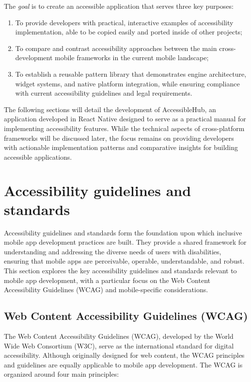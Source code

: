 The \textit{goal} is to create an accessible application that serves three key purposes:
\begin{enumerate}
    \item To provide developers with practical, interactive examples of accessibility implementation, able to be copied easily and ported inside of other projects;
    \item To compare and contrast accessibility approaches between the main cross-development mobile frameworks in the current mobile landscape;
    \item To establish a reusable pattern library that demonstrates engine architecture, widget systems, and native platform integration, while ensuring compliance with current accessibility guidelines and legal requirements.
\end{enumerate}

The following sections will detail the development of AccessibleHub, an application developed in React Native designed to serve as a practical manual for implementing accessibility features. While the technical aspects of cross-platform frameworks will be discussed later, the focus remains on providing developers with actionable implementation patterns and comparative insights for building accessible applications.

\section{Accessibility guidelines and standards}
\label{sec:guidelines}

Accessibility guidelines and standards form the foundation upon which inclusive mobile app development practices are built. They provide a shared framework for understanding and addressing the diverse needs of users with disabilities, ensuring that mobile apps are perceivable, operable, understandable, and robust. This section explores the key accessibility guidelines and standards relevant to mobile app development, with a particular focus on the Web Content Accessibility Guidelines (WCAG) and mobile-specific considerations.

\subsection{Web Content Accessibility Guidelines (WCAG)}

The Web Content Accessibility Guidelines (WCAG), developed by the World Wide Web Consortium (W3C), serve as the international standard for digital accessibility. Although originally designed for web content, the WCAG principles and guidelines are equally applicable to mobile app development. The WCAG is organized around four main principles:


